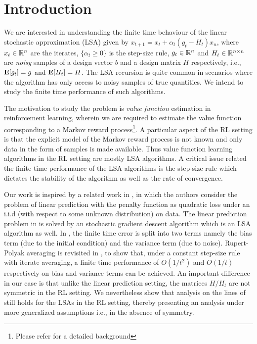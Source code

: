 \section{Introduction}
We are interested in understanding the finite time behaviour of the linear stochastic approximation (LSA) given by $x_{t+1}=x_t+\alpha_t(g_t-H_t)x_n$, where $x_t\in \mathbb{R}^n$ are the iterates, $\{\alpha_t\geq 0\}$ is the step-size rule, $g_t\in \mathbb{R}^n$ and $H_t\in \mathbb{R}^{n\times n}$ are \emph{noisy} samples of a design vector $b$ and a design matrix $H$ respectively, i.e., $\mathbf{E}[g_t]=g$ and $\mathbf{E}[H_t]=H$. The LSA recursion is quite common in scenarios where the algorithm has only access to noisy samples of true quantities. We intend to study the finite time performance of such algorithms.\par
The motivation to study the problem is \emph{value function} estimation in reinforcement learning, wherein we are required to estimate the value function corresponding to a Markov reward process\footnote{Please refer \cite{} for a detailed background}. A particular aspect of the RL setting is that the explicit model of the Markov reward process is not known and only data in the form of samples is made available. Thus value function learning algorithms in the RL setting are mostly LSA algorithms. A critical issue related the finite time performance of the LSA algorithms is the step-size rule which dictates the stability of the algorithm as well as the rate of convergence. 
\par
Our work is inspired by a related work in \cite{}, in which the authors consider the problem of linear prediction with the penalty function as quadratic loss under an i.i.d  (with respect to some unknown distribution) on data. The linear prediction problem in \cite{} is solved by an stochastic gradient descent algorithm which is an LSA algorithm as well. In \cite{}, the finite time error is split into two terms namely the bias term (due to the initial condition) and the variance term (due to noise). Rupert-Polyak averaging is revisited in \cite{}, to show that, under a constant step-size rule with iterate averaging, a finite time performance of $O(1/t^2)$ and $O(1/t)$ respectively on bias and variance terms can be achieved. An important difference in our case is that unlike the linear prediction setting, the matrices $H/H_t$ are not symmetric in the RL setting. We nevertheless show that analysis on the lines of \cite{} still holds for the LSAs in the RL setting, thereby presenting an analysis under more generalized assumptions i.e., in the absence of symmetry.\par
